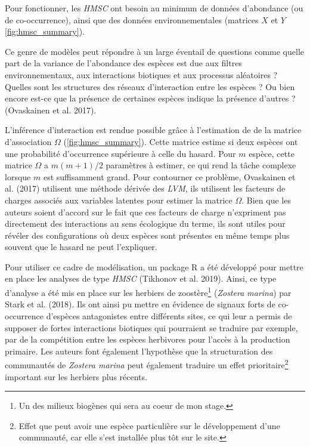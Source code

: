 \documentclass[
  12pt,
  a4paper,
  oneside]{report}
\begin{document}
Pour fonctionner, les \emph{HMSC} ont besoin au minimum de données
d'abondance (ou de co-occurrence), ainsi que des données
environnementales (matrices \(X\) et \(Y\) \cref{fig:hmsc_summary}).

Ce genre de modèles peut répondre à un large éventail de questions comme
quelle part de la variance de l'abondance des espèces est due aux
filtres environnementaux, aux interactions biotiques et aux processus
aléatoires ? Quelles sont les structures des réseaux d'interaction entre
les espèces ? Ou bien encore est-ce que la présence de certaines espèces
indique la présence d'autres ? (Ovaskainen et al. 2017).

L'inférence d'interaction est rendue possible grâce à l'estimation de de
la matrice d'association \(\Omega\) (\cref{fig:hmsc_summary}). Cette
matrice estime si deux espèces ont une probabilité d'occurrence
supérieure à celle du hasard. Pour \(m\) espèce, cette matrice
\(\Omega\) a \(m(m+1)/2\) paramètres à estimer, ce qui rend la tâche
complexe lorsque \(m\) est suffisamment grand. Pour contourner ce
problème, Ovaskainen et al. (2017) utilisent une méthode dérivée des
\emph{LVM}, ils utilisent les facteurs de charges associés aux variables
latentes pour estimer la matrice \(\Omega\). Bien que les auteurs soient
d'accord sur le fait que ces facteurs de charge n'expriment pas
directement des interactions au sens écologique du terme, ils sont
utiles pour révéler des configurations où deux espèces sont présentes en
même temps plus souvent que le hasard ne peut l'expliquer.

Pour utiliser ce cadre de modélisation, un package R a été développé
pour mettre en place les analyses de type \emph{HMSC} (Tikhonov et al.
2019). Ainsi, ce type d'analyse a été mis en place sur les herbiers de
zoostère\footnote{Un des milieux biogènes qui sera au coeur de mon
  stage.} (\emph{Zostera marina}) par Stark et al. (2018). Ils ont ainsi
pu mettre en évidence de signaux forts de co-occurrence d'espèces
antagonistes entre différents sites, ce qui leur a permis de supposer de
fortes interactions biotiques qui pourraient se traduire par exemple,
par de la compétition entre les espèces herbivores pour l'accès à la
production primaire. Les auteurs font également l'hypothèse que la
structuration des communautés de \emph{Zostera marina} peut également
traduire un effet prioritaire\footnote{Effet que peut avoir une espèce
  particulière sur le développement d'une communauté, car elle s'est
  installée plus tôt sur le site.} important sur les herbiers plus
récents.
\end{document}
